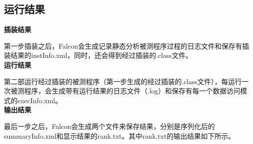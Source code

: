 \subsection{运行结果}
\noindent\textbf{插装结果}\par
第一步插装之后，Falcon会生成记录静态分析被测程序过程的日志文件和保存有插装结果的instInfo.xml，同时，还会得到经过插装的.class文件。\\
\textbf{运行结果}\par
第二部运行经过插装的被测程序（第一步生成的经过插装的.class文件），每运行一次被测程序，会生成带有运行结果的日志文件（.log）和保存有每一个数据访问模式的execInfo.xml。\\
\textbf{输出结果}\par
最后一步之后，Falcon会生成两个文件来保存结果，分别是序列化后的summaryInfo.xml和显示结果的rank.txt。其中rank.txt的输出结果如下所示。\\
~\\
